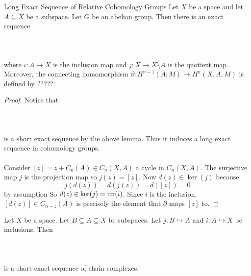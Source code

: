 \documentclass[a4paper]{article}
\begin{document}
\begin{thm}{Long Exact Sequence of Relative Cohomology Groups}{} Let $X$ be a space and let $A\subseteq X$ be a subspace. Let $G$ be an abelian group. Then there is an exact sequence \\~\\
\\~\\
where $\iota:A\to X$ is the inclusion map and $j:X\to X\setminus A$ is the quotient map. Moreover, the connecting homomorphism $\partial:H^{n-1}(A;M)\to H^n(X,A;M)$ is defined by ?????. \tcbline
\begin{proof}
Notice that \\~\\
\\~\\
is a short exact sequence by the above lemma. Thus it induces a long exact sequence in cohomology groups. \\~\\

Consider $[z]=z+C_n(A)\in C_n(X,A)$ a cycle in $C_n(X,A)$. The surjective map $j$ is the projection map so $j(z)=[z]$. Now $d(z)\in\ker(j)$ because $$j(d(z))=d(j(z))=d([z])=0$$ by assumption So $d(z)\in\ker(j)=\operatorname{im}(i)$. Since $i$ is the inclusion, $[d(z)]\in C_{n-1}(A)$ is precisely the element that $\partial$ maps $[z]$ to. 
\end{proof}
\end{thm}

\begin{prp}{}{} Let $X$ be a space. Let $B\subseteq A\subseteq X$ be subspaces. Let $j:B\hookrightarrow A$ and $i:A\hookrightarrow X$ be inclusions. Then \\~\\
\\~\\
is a short exact sequence of chain complexes. 
\end{prp}
\end{document}
